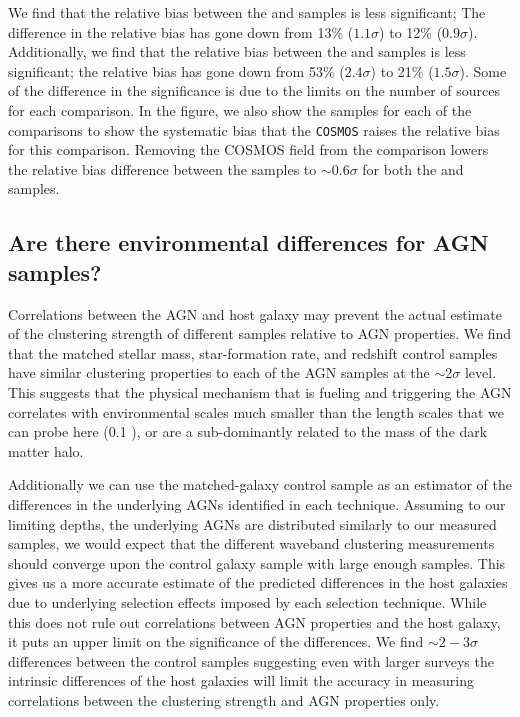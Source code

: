 We find that the relative bias between the \Radio and \lowlambda \Xray samples is less significant;
The difference in the relative bias has gone down from 13\% ($1.1\sigma$) to 12\% ($0.9\sigma$).
Additionally, we find that the relative bias between the \Donley and \highlambda \Xray samples is less significant; the relative bias has gone down from 53\% ($2.4\sigma$) to 21\% ($1.5\sigma$).
Some of the difference in the significance is due to the limits on the number of sources for each comparison.
In the figure, we also show the \nocosmos samples for each of the comparisons to show the systematic bias that the \texttt{COSMOS} raises the relative bias for this comparison.
Removing the COSMOS field from the comparison lowers the relative bias difference between the samples to $\sim0.6\sigma$ for both the \highlambda and \lowlambda samples.


\subsection{Are there environmental differences for AGN samples?}\label{sec:environdiscussion}
Correlations between the AGN and host galaxy may prevent the actual estimate of the clustering strength of different samples relative to AGN properties.
We find that the matched stellar mass, star-formation rate, and redshift control samples have similar clustering properties to each of the AGN samples at the $\sim2\sigma$ level.
This suggests that the physical mechanism that is fueling and triggering the AGN correlates with environmental scales much smaller than the length scales that we can probe here (0.1 \hMpc), or are a sub-dominantly related to the mass of the dark matter halo.

Additionally we can use the matched-galaxy control sample as an estimator of the differences in the underlying AGNs identified in each technique.
Assuming to our limiting depths, the underlying AGNs are distributed similarly to our measured samples, we would expect that the different waveband clustering measurements should converge upon the control galaxy sample with large enough samples.
This gives us a more accurate estimate of the predicted differences in the host galaxies due to underlying selection effects imposed by each selection technique.
While this does not rule out correlations between AGN properties and the host galaxy, it puts an upper limit on the significance of the differences.
We find $\sim2-3\sigma$ differences between the control samples suggesting even with larger surveys the intrinsic differences of the host galaxies will limit the accuracy in measuring correlations between the clustering strength and AGN properties only. 





